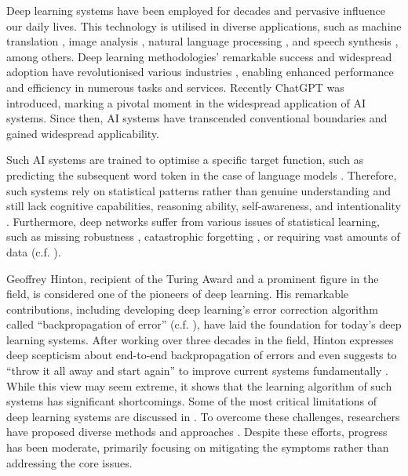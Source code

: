 Deep learning systems have been employed for decades \cite{ivakhnenko_cybernetic_1965} and pervasive influence our daily lives. This technology is utilised in diverse applications, such as machine translation \cite{dabre_survey_2021}, image analysis \cite{bhatt_cnn_2021}, natural language processing \cite{otter_survey_2021}, and speech synthesis \cite{ning_review_2019}, among others. Deep learning methodologies' remarkable success and widespread adoption have revolutionised various industries , enabling enhanced performance and efficiency in numerous tasks and services.
Recently ChatGPT  was introduced, marking a pivotal moment in the widespread application of AI systems.
Since then, AI systems have transcended conventional boundaries and gained widespread applicability.

Such AI systems are trained to optimise a specific target function, such as predicting the subsequent word token in the case of language models .
Therefore, such systems rely on statistical patterns rather than genuine understanding and still lack cognitive capabilities, reasoning ability, self-awareness, and intentionality .
Furthermore, deep networks suffer from various issues of statistical learning, such as missing robustness , catastrophic forgetting , or requiring vast amounts of data  (c.f. ).

Geoffrey Hinton, recipient of the Turing Award and a prominent figure in the field, is considered one of the pioneers of deep learning.
His remarkable contributions, including developing deep learning's error correction algorithm called ``backpropagation of error'' (c.f. ), have laid the foundation for today's deep learning systems.
After working over three decades in the field, Hinton expresses deep scepticism about end-to-end backpropagation of errors and even suggests to ``throw it all away and start again'' to improve current systems fundamentally .
While this view may seem extreme, it shows that the learning algorithm of such systems has significant shortcomings.
Some of the most critical limitations of deep learning systems are discussed in .
To overcome these challenges, researchers have proposed diverse methods and approaches \cite{long_survey_2022, sager_unsupervised_2022, yarats_improving_2021}. Despite these efforts, progress has been moderate, primarily focusing on mitigating the symptoms rather than addressing the core issues.

